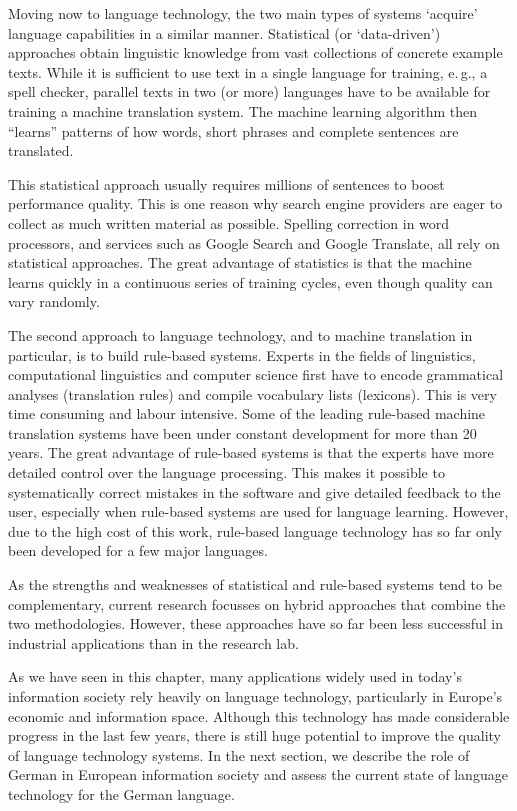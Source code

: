 \documentclass[]{../../metanetpaper}
\begin{document}
\begin{multicols}{2}
Moving now to language technology, the two main types of systems ‘acquire’ language capabilities in a similar manner. Statistical (or ‘data-driven’) approaches obtain linguistic knowledge from vast collections of concrete example texts. While it is sufficient to use text in a single language for training, e.\,g., a spell checker, parallel texts in two (or more) languages have to be available for training a machine translation system. The machine learning algorithm then “learns” patterns of how words, short phrases and complete sentences are translated. 

This statistical approach usually requires millions of sentences to boost performance quality. This is one reason why search engine providers are eager to collect as much written material as possible. Spelling correction in word processors, and services such as Google Search and Google Translate, all rely on statistical approaches. The great advantage of statistics is that the machine learns quickly in a continuous series of training cycles, even though quality can vary randomly.

The second approach to language technology, and to machine translation in particular, is to build rule-based systems. Experts in the fields of linguistics, computational linguistics and computer science first have to encode grammatical analyses (translation rules) and compile vocabulary lists (lexicons). This is very time consuming and labour intensive. Some of the leading rule-based machine translation systems have been under constant development for more than 20 years. The great advantage of rule-based systems is that the experts have more detailed control over the language processing. This makes it possible to systematically correct mistakes in the software and give detailed feedback to the user, especially when rule-based systems are used for language learning. However, due to the high cost of this work, rule-based language technology has so far only been developed for a few major languages. 


As the strengths and weaknesses of statistical and rule-based systems tend to be complementary, current research focusses on hybrid approaches that combine the two methodologies. However, these approaches have so far been less successful in industrial applications than in the research lab. 

As we have seen in this chapter, many applications widely used in today’s information society rely heavily on language technology, particularly in Europe’s economic and information space. Although this technology has made considerable progress in the last few years, there is still huge potential to improve the quality of language technology systems. In the next section, we describe the role of German in European information society and assess the current state of language technology for the German language.
\end{multicols}
\end{document}
